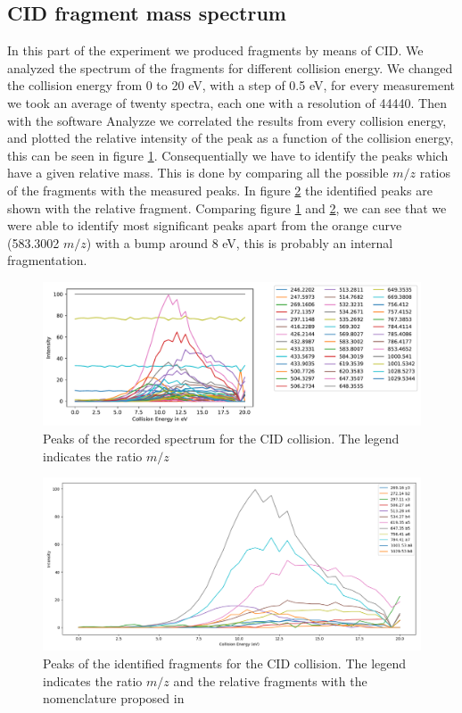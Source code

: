 \documentclass[a4paper,10pt]{article}
\begin{document}
\subsection{CID fragment mass spectrum}
In this part of the experiment we produced fragments by means of CID. We analyzed the spectrum of the fragments for  different collision energy. %
We changed the collision energy from 0 to 20 eV, with a step of 0.5 eV, for every measurement we took an average of twenty spectra, each one with a resolution of 44440. Then with the software Analyzze we correlated the results from every collision energy, and plotted the relative intensity of the peak as a function of the collision energy, this can be seen in figure \ref{cidcollision}.
Consequentially we have to identify the peaks which have a given relative mass. This is done by comparing all the possible $m/z$ ratios of the fragments with the measured peaks. In figure \ref{cidcollisionidentified} the identified peaks are shown with the relative fragment. Comparing figure \ref{cidcollision} and \ref{cidcollisionidentified}, we can see that we were able to identify most significant peaks apart from the orange curve (583.3002 $m/z$) with a bump around 8 eV, this is probably an internal fragmentation.
\begin{figure}[H]
	\centering
	\includegraphics[width = \textwidth]{cid_collision}
	\caption{Peaks of the recorded spectrum for the CID collision. The legend indicates the ratio $m/z$}
	\label{cidcollision}
\end{figure}
\begin{figure}[H]
	\centering
	\includegraphics[width = \textwidth]{identifiedcid}
	\caption{Peaks of the identified fragments for the CID collision. The legend indicates the ratio $m/z$ and the relative fragments with the nomenclature proposed in \cite{fragmentsnomenclature}}
	\label{cidcollisionidentified}
\end{figure}
\end{document}

